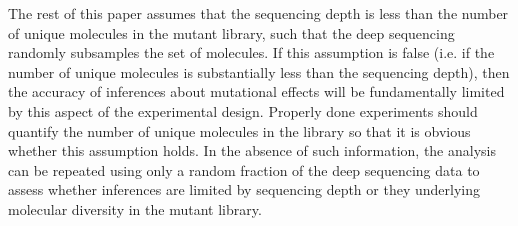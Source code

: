 \documentclass[twocolumn]{bmcart}%
\begin{document}
The rest of this paper assumes that the sequencing depth is less than the number of unique molecules in the mutant library, such that the deep sequencing randomly subsamples the set of molecules. If this assumption is false (i.e. if the number of unique molecules is substantially less than the sequencing depth), then the accuracy of inferences about mutational effects will be fundamentally limited by this aspect of the experimental design. Properly done experiments should quantify the number of unique molecules in the library so that it is obvious whether this assumption holds. In the absence of such information, the analysis can be repeated using only a random fraction of the deep sequencing data to assess whether inferences are limited by sequencing depth or they underlying molecular diversity in the mutant library.
\end{document}
